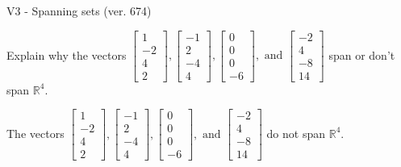 \begin{exercise}
  \begin{exerciseTitle}V3 - Spanning sets (ver. 674)\end{exerciseTitle}
  \begin{exerciseStatement}
    Explain why the vectors \(\left[\begin{array}{r}
1 \\
-2 \\
4 \\
2
\end{array}\right] , \left[\begin{array}{r}
-1 \\
2 \\
-4 \\
4
\end{array}\right] , \left[\begin{array}{r}
0 \\
0 \\
0 \\
-6
\end{array}\right] , \text{ and } \left[\begin{array}{r}
-2 \\
4 \\
-8 \\
14
\end{array}\right]\) span or don't span \(\mathbb{R}^4\). 
	


  \end{exerciseStatement}
  \begin{exerciseAnswer}
   The vectors \(\left[\begin{array}{r}
1 \\
-2 \\
4 \\
2
\end{array}\right] , \left[\begin{array}{r}
-1 \\
2 \\
-4 \\
4
\end{array}\right] , \left[\begin{array}{r}
0 \\
0 \\
0 \\
-6
\end{array}\right] , \text{ and } \left[\begin{array}{r}
-2 \\
4 \\
-8 \\
14
\end{array}\right]\) 
  	 do not  
	span \(\mathbb{R}^4\).
  


  \end{exerciseAnswer}
\end{exercise}